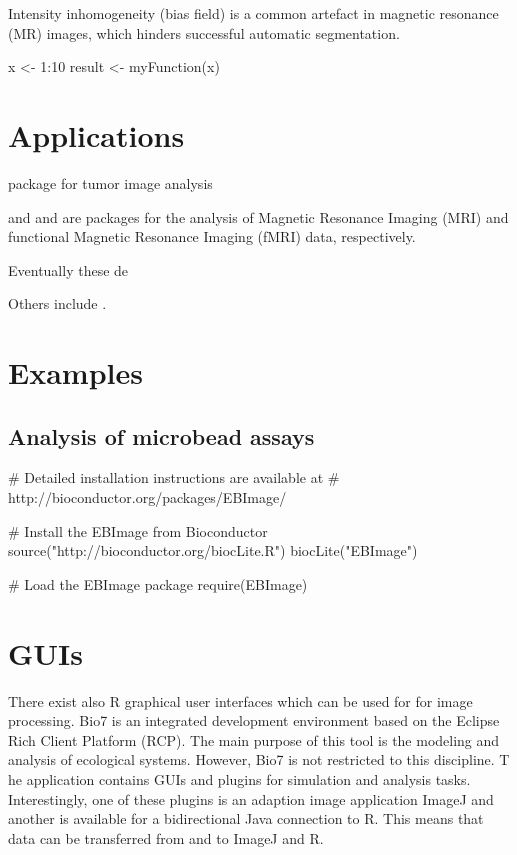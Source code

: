 Intensity inhomogeneity (bias field) is a common artefact in 
magnetic resonance (MR) images, which hinders successful automatic segmentation. \citep{ivanovska_efficient_2016}


\begin{example}
  x <- 1:10
  result <- myFunction(x)
\end{example}


\section{Applications}

 package \citep{failmezger_crimage:_2012} for tumor image analysis

 \citep{marchini_analyzefmri:_2002} and  
\citep{polzehl_fmri:_2007} and are packages for the analysis of Magnetic 
Resonance Imaging (MRI) and functional Magnetic Resonance Imaging (fMRI) data, 
respectively.

Eventually these de 

Others include  \citep{dunning_beadarray:_2006, frery_introduction_2013}.

\section{Examples}
\subsection{Analysis of microbead assays}


\begin{example}
# Detailed installation instructions are available at 
# http://bioconductor.org/packages/EBImage/

# Install the EBImage from Bioconductor
source("http://bioconductor.org/biocLite.R")
biocLite("EBImage")

# Load the EBImage package
require(EBImage)
\end{example}


\section{GUIs}

There exist also R graphical user interfaces \citep{rodiger_rkward:_2012} which can be used for for image processing. 
Bio7 is an integrated development environment based on the Eclipse Rich Client 
Platform (RCP). The main purpose of this tool is the modeling and analysis of 
ecological systems. However, Bio7 is not restricted to this discipline. T
he application contains GUIs and plugins for simulation and analysis tasks. 
Interestingly, one of these plugins is an adaption image application ImageJ 
and another is available for a bidirectional Java connection to R. This 
means that data can be transferred from and to ImageJ and R.



